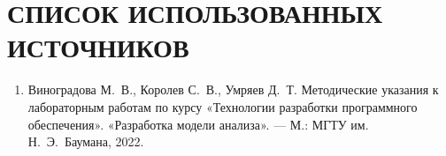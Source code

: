 \section*{СПИСОК ИСПОЛЬЗОВАННЫХ ИСТОЧНИКОВ}
\begin{enumerate}
 \item Виноградова М.~В., Королев С.~В., Умряев Д.~Т.
 Методические указания к лабораторным работам по курсу
 «Технологии разработки программного обеспечения».
 «Разработка модели анализа». --- М.: МГТУ им. Н.~Э.~Баумана, 2022.
\end{enumerate}
